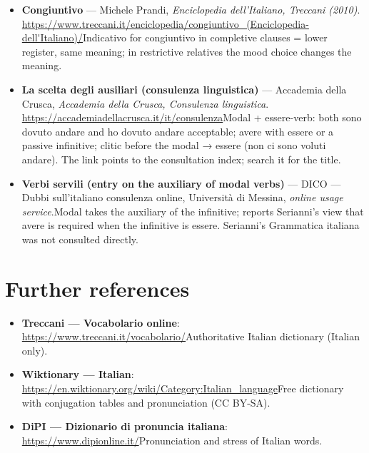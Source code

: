 \documentclass[11pt,a4paper,twoside,openright]{book}
\begin{document}
\begin{itemize}
\item\relax \textbf{Congiuntivo} --- Michele Prandi, \textit{Enciclopedia dell'Italiano, Treccani (2010)}. \url{https://www.treccani.it/enciclopedia/congiuntivo_(Enciclopedia-dell'Italiano)/}\newline Indicativo for congiuntivo in completive clauses = lower register, same meaning; in restrictive relatives the mood choice changes the meaning.
\item\relax \textbf{La scelta degli ausiliari (consulenza linguistica)} --- Accademia della Crusca, \textit{Accademia della Crusca, Consulenza linguistica}. \url{https://accademiadellacrusca.it/it/consulenza}\newline Modal + essere-verb: both sono dovuto andare and ho dovuto andare acceptable; avere with essere or a passive infinitive; clitic before the modal → essere (non ci sono voluti andare). The link points to the consultation index; search it for the title.
\item\relax \textbf{Verbi servili (entry on the auxiliary of modal verbs)} --- DICO — Dubbi sull'italiano consulenza online, Università di Messina, \textit{online usage service}.\newline Modal takes the auxiliary of the infinitive; reports Serianni's view that avere is required when the infinitive is essere. Serianni's Grammatica italiana was not consulted directly.
\end{itemize}
\section{Further references}
\begin{itemize}
\item\relax \textbf{Treccani — Vocabolario online}: \url{https://www.treccani.it/vocabolario/}\newline Authoritative Italian dictionary (Italian only).
\item\relax \textbf{Wiktionary — Italian}: \url{https://en.wiktionary.org/wiki/Category:Italian_language}\newline Free dictionary with conjugation tables and pronunciation (CC BY-SA).
\item\relax \textbf{DiPI — Dizionario di pronuncia italiana}: \url{https://www.dipionline.it/}\newline Pronunciation and stress of Italian words.
\end{itemize}
\end{document}
